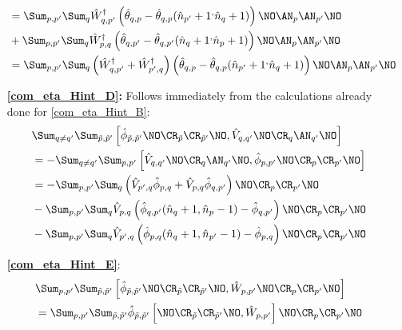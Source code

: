 \begin{appendix}
\begin{itemize}
\begin{align}
&=\Sum_{p, p^\prime}\Sum_{q}\hat W_{q,p^\prime}^\dagger \left(\hat\theta_{ q,p}-\hat\theta_{ q,p}(\hat n_{p^\prime}+1^,\hat n_{q}+1)\right)\NO\AN_{p}\AN_{p^\prime}\NO\\
&+\Sum_{p, p^\prime}\Sum_{q}\hat W_{p,q}^\dagger \left(\hat\theta_{ q, p^\prime}-\hat\theta_{ q, p^\prime}(\hat n_{q}+1^,\hat n_p+1)\right)\NO\AN_{p}\AN_{p^\prime}\NO\nonumber\\
&=\Sum_{p, p^\prime}\Sum_{q}\left(\hat W_{q,p^\prime}^\dagger+\hat W_{p^\prime,q}^\dagger\right) \left(\hat\theta_{ q,p}-\hat\theta_{ q,p}(\hat n_{p^\prime}+1^,\hat n_{q}+1)\right)\NO\AN_{p}\AN_{p^\prime}\NO
\end{align}
\item[\textbf{\ref{com_eta_Hint_D}:}] Follows immediately from the calculations already done for \ref{com_eta_Hint_B}:
\begin{subequations}
\begin{align}
&\Sum_{q\neq q^\prime}\Sum_{\tilde p,\tilde p^\prime} \left[\hat\phi_{\tilde p,\tilde p^\prime}\NO\CR_{\tilde p}\CR_{\tilde p^\prime}\NO,\hat V_{q,q^\prime}\NO\CR_q\AN_{q^\prime}\NO\right]\\
&=-\Sum_{q\neq q^\prime}\Sum_{ p, p^\prime} \left[\hat V_{q,q^\prime}\NO\CR_q\AN_{q^\prime}\NO,\hat\phi_{ p, p^\prime}\NO\CR_{ p}\CR_{ p^\prime}\NO\right]\\
&=-\Sum_{p, p^\prime}\Sum_{q}\left(\hat V_{ p^\prime, q}\hat \phi_{p,q}+\hat V_{ p,q}\hat \phi_{q,p^\prime}\right)\NO\CR_p\CR_{p^\prime}\NO\\
&-\Sum_{p, p^\prime}\Sum_{ q} \hat V_{ p,q}\left(\hat \phi_{q,p^\prime}(\hat n_{q}+1,\hat n_p-1)- \hat \phi_{q,p^\prime}\right)\NO\CR_p\CR_{p^\prime}\NO\nonumber \\
&-\Sum_{p, p^\prime}\Sum_{ q} \hat V_{ p^\prime,q}\left(\hat \phi_{p,q}(\hat n_{q}+1,\hat n_{p^\prime}-1)- \hat \phi_{p,q}\right)\NO\CR_p\CR_{p^\prime}\NO\nonumber
\end{align}
\end{subequations}
\item[\textbf{\ref{com_eta_Hint_E}}:] 
\begin{subequations}
\begin{align}
&\Sum_{p, p^\prime}\Sum_{\tilde p,\tilde p^\prime} \left[\hat\phi_{\tilde p,\tilde p^\prime}\NO\CR_{\tilde p}\CR_{\tilde p^\prime}\NO,\hat W_{p,p^\prime}\NO\CR_p\CR_{p^\prime}\NO\right]\nonumber\\
&=\Sum_{p, p^\prime}\Sum_{\tilde p,\tilde p^\prime} \hat\phi_{\tilde p,\tilde p^\prime}\left[\NO\CR_{\tilde p}\CR_{\tilde p^\prime}\NO,\hat W_{p,p^\prime}\right]\NO\CR_p\CR_{p^\prime}\NO\label{com_eta_Hint_E1}\\

\end{align}
\end{subequations}
\end{itemize}
\end{appendix}
